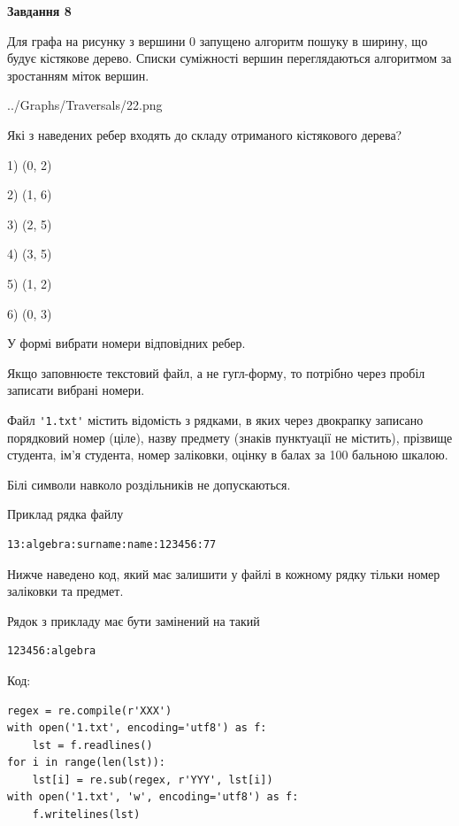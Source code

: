 \documentclass[12pt, ukrainian]{article}
\def\code#1{\Verb!#1!}
\begin{document}
{\begin {large}
{\begin {center}\textbf{Завдання 8}\end {center}}\par
Для графа на рисунку з вершини 0 запущено алгоритм пошуку в ширину, що будує кістякове дерево. Списки суміжності вершин переглядаються алгоритмом за зростанням міток вершин.\par
\begin{center}
	{../Graphs/Traversals/22.png}
\end{center}
\par Які з наведених ребер входять до складу отриманого кістякового дерева?\par
1) (0, 2)\par
2) (1, 6)\par
3) (2, 5)\par
4) (3, 5)\par
5) (1, 2)\par
6) (0, 3)\par
{\vskip 15pt} У формі вибрати номери відповідних ребер.


Якщо заповнюєте текстовий файл, а не гугл-форму, то потрібно через пробіл записа\-ти вибрані номери.\par
\newpage


Файл \code{'1.txt'} містить відомість з рядками, в яких через двокрапку записано поряд\-ковий номер (ціле), назву предмету (знаків пунктуації не містить), прізвище студента, ім'я студента, номер заліковки, оцінку в балах за 100 бальною шкалою.

Білі символи навколо роздільників не допускаються.

Приклад рядка файлу



\begin{verbatim}
13:algebra:surname:name:123456:77
\end{verbatim}


Нижче наведено код, який має залишити у файлі в кожному рядку тільки номер заліковки та предмет.

Рядок з прикладу має бути замінений на такий



\begin{verbatim}
123456:algebra
\end{verbatim}




Код:



\begin{verbatim}
regex = re.compile(r'XXX')
with open('1.txt', encoding='utf8') as f:
    lst = f.readlines()
for i in range(len(lst)):
    lst[i] = re.sub(regex, r'YYY', lst[i])
with open('1.txt', 'w', encoding='utf8') as f:
    f.writelines(lst)
\end{verbatim}







\end{large}}
\end{document}
